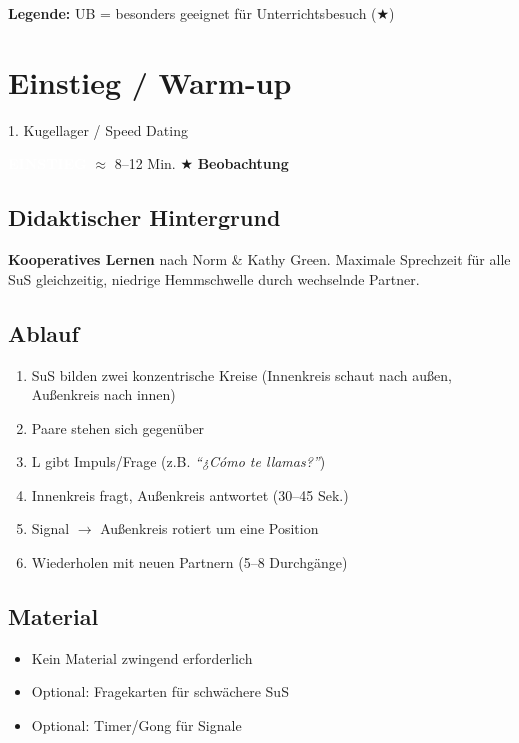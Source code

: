 \documentclass[11pt, a4paper]{article}
\newcommand{\tagEinstieg}{\colorbox{einstieg}{\textcolor{white}{\footnotesize\textbf{EINSTIEG}}}}
\newcommand{\zeit}[1]{\textcolor{grau}{\footnotesize $\approx$ #1 Min.}}
\newcommand{\beobachtung}{\textcolor{erfolg}{\footnotesize $\bigstar$ \textbf{Beobachtung}}}
\begin{document}
\textbf{Legende:} UB = besonders geeignet für Unterrichtsbesuch ($\bigstar$)

\newpage


\section{Einstieg / Warm-up}

\begin{methode}{1. Kugellager / Speed Dating}

\tagEinstieg{} \zeit{8--12} \hfill \beobachtung

\subsection*{Didaktischer Hintergrund}
\textbf{Kooperatives Lernen} nach Norm \& Kathy Green. Maximale Sprechzeit für alle SuS gleichzeitig, niedrige Hemmschwelle durch wechselnde Partner.

\subsection*{Ablauf}
\begin{enumerate}[leftmargin=*]
    \item SuS bilden zwei konzentrische Kreise (Innenkreis schaut nach außen, Außenkreis nach innen)
    \item Paare stehen sich gegenüber
    \item L gibt Impuls/Frage (z.B. \textit{``¿Cómo te llamas?''})
    \item Innenkreis fragt, Außenkreis antwortet (30--45 Sek.)
    \item Signal $\rightarrow$ Außenkreis rotiert um eine Position
    \item Wiederholen mit neuen Partnern (5--8 Durchgänge)
\end{enumerate}

\subsection*{Material}
\begin{materialbox}
\begin{itemize}[label=$\square$, leftmargin=*]
    \item Kein Material zwingend erforderlich
    \item Optional: Fragekarten für schwächere SuS
    \item Optional: Timer/Gong für Signale
\end{itemize}


\end{materialbox}
\end{methode}
\end{document}
